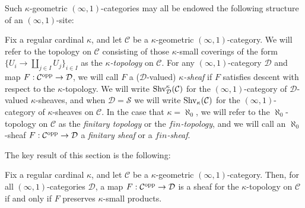\documentclass[10pt]{article}
\newcommand{\mS}{\mathcal S}
\newcommand{\C}{\mathcal C}
\newcommand{\cD}{\mathcal{D}}
\theoremstyle{witharg}
\theoremstyle{witharg}
\theoremstyle{witharg2}
\begin{document}
\noindent 

\noindent Such $\kappa$-geometric $(\infty,1)$-categories may all be endowed the following structure of an $(\infty,1)$-site:

\begin{definition}{}\label{Conditions for the kappa Product Topology}

    Fix a regular cardinal $\kappa$, and let $\C$ be a $\kappa$-geometric $(\infty,1)$-category. We will refer to the topology on $\C$ consisting of those $\kappa$-small coverings of the form $\{U_i\rightarrow \coprod_{j\in I}U_j\}_{i\in I}$ as the \emph{$\kappa$-topology} on $\C$. For any $(\infty,1)$-category $\cD$ and map $F:\C^{\textnormal{opp}}\rightarrow \cD$, we will call $F$ a ($\cD$-valued) \emph{$\kappa$-sheaf} if $F$ satisfies descent with respect to the $\kappa$-topology. We will write $\textnormal{Shv}^\kappa_\cD(\C)$ for the $(\infty,1)$-category of $\cD$-valued $\kappa$-sheaves, and when $\cD=\mS$ we will write $\textnormal{Shv}_\kappa(\C)$ for the $(\infty,1)$-category of $\kappa$-sheaves on $\C$. In the case that $\kappa=\aleph_0$, we will refer to the $\aleph_0$-topology on $\C$ as the \emph{finitary topology} or the \emph{$fin$-topology}, and we will call an $\aleph_0$-sheaf $F:\C^{\textnormal{opp}}\rightarrow \cD$ a \emph{finitary sheaf} or a \emph{$fin$-sheaf}.
    

\end{definition}




\noindent The key result of this section is the following: 


\begin{proposition}{}\label{Sheaves for the kappa Product Topology}

    Fix a regular cardinal $\kappa$, and let $\C$ be a $\kappa$-geometric $(\infty,1)$-category. Then, for all $(\infty,1)$-categories $\cD$, a map $F:\C^{\textnormal{opp}}\rightarrow \cD$ is a sheaf for the $\kappa$-topology on $\C$ if and only if $F$ preserves $\kappa$-small products. 
    
\end{proposition}
\end{document}
